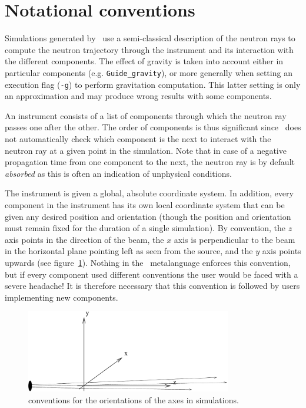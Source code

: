 \section{Notational conventions}

Simulations generated by \MCS\ use a semi-classical description of the neutron
rays to compute the neutron trajectory through the instrument and its
interaction with the different components. The effect of gravity is taken into
account either in particular components (e.g. \verb+Guide_gravity+), or more
generally when setting an execution flag (\verb+-g+) to perform gravitation
computation. This latter setting is only an approximation and may produce wrong
results with some components.

An instrument consists of a list of components through which the neutron
ray passes one after the other. The order of components is thus significant
since \MCS\ does not automatically check which component is the next to
interact with the neutron ray at a given point in the simulation. Note
that in case of a negative propagation time from one component to the
next, the neutron ray is by default \emph{absorbed} as this is often
an indication of unphysical conditions.

The instrument is given a global, absolute coordinate system. In
addition, every component in the instrument has its own local coordinate
system that can be given any desired position and orientation (though
the position and orientation must remain fixed for the duration of a
single simulation). 
By convention, the $z$ axis points in the direction of the beam, the $x$ axis
is perpendicular to the beam in the horizontal plane pointing left as seen
from the source, and the $y$ axis points upwards (see figure~\ref{f:axis}).
Nothing in the \MCS\ metalanguage enforces this convention, but if every component used
different conventions the user would be faced with a severe headache! It is
therefore necessary that this convention is followed by users implementing
new components.
\begin{figure}
  \begin{center}
    \includegraphics[width=0.8\textwidth]{figures/axis-conventions}
  \end{center}
\caption{conventions for the orientations of the axes in simulations.}
\label{f:axis}
\end{figure}

